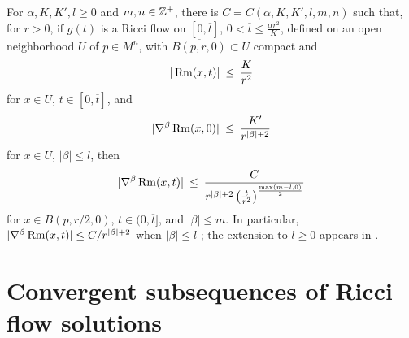 \begin{theorem}
  \label{thm:kl-local-derivative-estimates-existence-local-derivative-estimates}
 \label{localder}

For $\alpha,K,K',l\geq0$ and $m,n\in{\mathbb Z}^+$, there is
$C=C(\alpha,K,K',l,m,n)$ such that, for $r>0$, if $g(t)$ is a Ricci flow
on $[0,\overline t]$, $0<\overline t\leq\frac{\alpha r^2}{K}$, defined on
an open neighborhood $U$ of $p\in M^n$, with
$\overline{B(p,r,0)}\subset U$ compact and
\begin{equation}
|\operatorname{Rm}(x,t)|\: \le \:\frac K{r^2}
\end{equation}
for $x\in U$, $t\in[0,\overline t]$, and
\begin{equation}
|\nabla^\beta\operatorname{Rm}(x,0)|\: \le \:\frac{K'}{r^{|\beta|+2}}
\end{equation}
for $x\in U$, $|\beta|\leq l$, then
\begin{equation}
|\nabla^\beta\operatorname{Rm}(x,t)|\: \le \:
\frac{C}{r^{|\beta|+2}\left(\frac{t}{r^2}\right)^{\frac{\max(m-l,0)}2}}
\end{equation}
for $x\in B(p,r/2,0)$, $t\in(0,\overline t]$, and $|\beta|\leq m$.
In particular, $|\nabla^\beta\operatorname{Rm}(x,t)|\leq C/r^{|\beta|+2}$ when
$|\beta|\leq l$ \cite{Shi2}; the extension to $l\geq0$ appears in
\cite[Appendix B]{Lu-Tian}.
\end{theorem}

\section{Convergent subsequences of Ricci flow solutions}
\label{subsequence}

